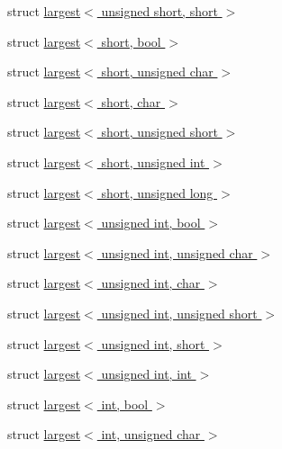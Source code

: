 \begin{DoxyCompactItemize}
\item 
struct \hyperlink{structcimg__library_1_1cimg_1_1largest_3_01unsigned_01short_00_01short_01_4}{largest$<$ unsigned short, short $>$}
\item 
struct \hyperlink{structcimg__library_1_1cimg_1_1largest_3_01short_00_01bool_01_4}{largest$<$ short, bool $>$}
\item 
struct \hyperlink{structcimg__library_1_1cimg_1_1largest_3_01short_00_01unsigned_01char_01_4}{largest$<$ short, unsigned char $>$}
\item 
struct \hyperlink{structcimg__library_1_1cimg_1_1largest_3_01short_00_01char_01_4}{largest$<$ short, char $>$}
\item 
struct \hyperlink{structcimg__library_1_1cimg_1_1largest_3_01short_00_01unsigned_01short_01_4}{largest$<$ short, unsigned short $>$}
\item 
struct \hyperlink{structcimg__library_1_1cimg_1_1largest_3_01short_00_01unsigned_01int_01_4}{largest$<$ short, unsigned int $>$}
\item 
struct \hyperlink{structcimg__library_1_1cimg_1_1largest_3_01short_00_01unsigned_01long_01_4}{largest$<$ short, unsigned long $>$}
\item 
struct \hyperlink{structcimg__library_1_1cimg_1_1largest_3_01unsigned_01int_00_01bool_01_4}{largest$<$ unsigned int, bool $>$}
\item 
struct \hyperlink{structcimg__library_1_1cimg_1_1largest_3_01unsigned_01int_00_01unsigned_01char_01_4}{largest$<$ unsigned int, unsigned char $>$}
\item 
struct \hyperlink{structcimg__library_1_1cimg_1_1largest_3_01unsigned_01int_00_01char_01_4}{largest$<$ unsigned int, char $>$}
\item 
struct \hyperlink{structcimg__library_1_1cimg_1_1largest_3_01unsigned_01int_00_01unsigned_01short_01_4}{largest$<$ unsigned int, unsigned short $>$}
\item 
struct \hyperlink{structcimg__library_1_1cimg_1_1largest_3_01unsigned_01int_00_01short_01_4}{largest$<$ unsigned int, short $>$}
\item 
struct \hyperlink{structcimg__library_1_1cimg_1_1largest_3_01unsigned_01int_00_01int_01_4}{largest$<$ unsigned int, int $>$}
\item 
struct \hyperlink{structcimg__library_1_1cimg_1_1largest_3_01int_00_01bool_01_4}{largest$<$ int, bool $>$}
\item 
struct \hyperlink{structcimg__library_1_1cimg_1_1largest_3_01int_00_01unsigned_01char_01_4}{largest$<$ int, unsigned char $>$}

\end{DoxyCompactItemize}
